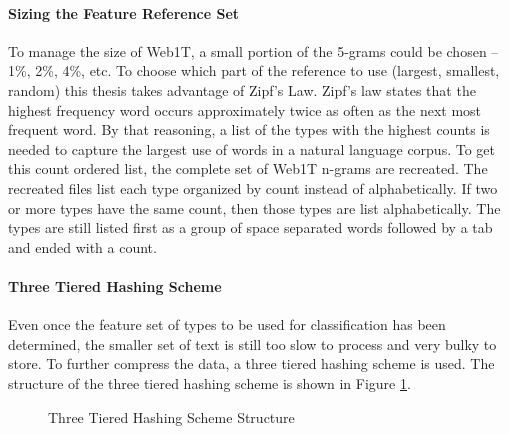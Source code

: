 		\paragraph{Sizing the Feature Reference Set} To manage the size of Web1T, a small portion of the 5-grams could be chosen -- 1\%, 2\%, 4\%, etc.  To choose which part of the reference to use (largest, smallest, random) this thesis takes advantage of Zipf's Law.  Zipf's law states that the highest frequency word occurs approximately twice as often as the next most frequent word.  By that reasoning, a list of the types with the highest counts is needed to capture the largest use of words in a natural language corpus.  To get this count ordered list, the complete set of Web1T n-grams are recreated.  The recreated files list each type organized by count instead of alphabetically.  If two or more types have the same count, then those types are list alphabetically.  The types are still listed first as a group of space separated words followed by a tab and ended with a count.

		\paragraph{Three Tiered Hashing Scheme} Even once the feature set of types to be used for classification has been determined, the smaller set of text is still too slow to process and very bulky to store.  To further compress the data, a three tiered hashing scheme is used.  The structure of the three tiered hashing scheme is shown in Figure \ref{fig:3tierHashStructure}. 
		
		\begin{figure}[ht!]
			\begin{center}
				\caption{Three Tiered Hashing Scheme Structure}
				\label{fig:3tierHashStructure}
			\end{center}
		\end{figure}
		
